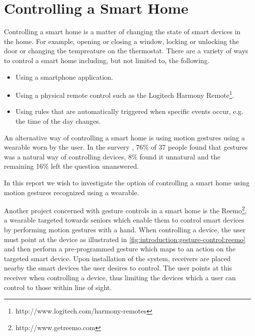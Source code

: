\section{Controlling a Smart Home}
\label{sec:introduction:gesture-control}

Controlling a smart home is a matter of changing the state of smart devices in the home. For example, opening or closing a window, locking or unlocking the door or changing the tempreature on the thermostat. There are a variety of ways to control a smart home including, but not limited to, the following.

\begin{itemize}
\item Using a smartphone application.
\item Using a physical remote control such as the Logitech Harmony Remote\footnote{http://www.logitech.com/harmony-remotes}.
\item Using rules that are automatically triggered when specific events occur, e.g. the time of the day changes.
\end{itemize}

An alternative way of controlling a smart home is using motion gestures using a wearable worn by the user. In the survery \cite{Kela2006}, 76\% of 37 people found that gestures was a natural way of controlling devices, 8\% found it unnatural and the remaining 16\% left the question unanswered.

In this report we wish to investigate the option of controlling a smart home using motion gestures recognized using a wearable.

Another project concerned with gesture controls in a smart home is the Reemo\footnote{http://www.getreemo.com}, a wearable targeted towards seniors which enable them to control smart devices by performing motion gestures with a hand. When controlling a device, the user must point at the device as illustrated in \cref{fig:introduction:gesture-control:reemo} and then perform a pre-programmed gesture which maps to an action on the targeted smart device. Upon installation of the system, receivers are placed nearby the smart devices the user desires to control. The user points at this receiver when controlling a device, thus limiting the devices which a user can control to those within line of sight.

